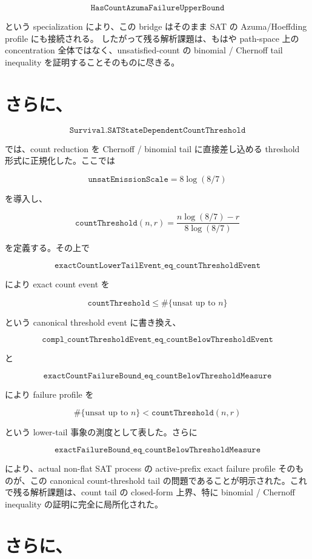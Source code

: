 \documentclass[12pt,a4paper]{article}
\begin{document}
\[
\texttt{HasCountAzumaFailureUpperBound}
\]

という specialization により、この bridge はそのまま SAT の Azuma/Hoeffding profile にも接続される。 したがって残る解析課題は、もはや path-space 上の concentration 全体ではなく、unsatisfied-count の binomial / Chernoff tail inequality を証明することそのものに尽きる。

\section{さらに、}\label{ux3055ux3089ux306b-23}

\[
\texttt{Survival.SATStateDependentCountThreshold}
\]

では、count reduction を Chernoff / binomial tail に直接差し込める threshold 形式に正規化した。ここでは

\[
\texttt{unsatEmissionScale}=8\log(8/7)
\]

を導入し、

\[
\texttt{countThreshold}(n,r)=\frac{n\log(8/7)-r}{8\log(8/7)}
\]

を定義する。その上で

\[
\texttt{exactCountLowerTailEvent\_eq\_countThresholdEvent}
\]

により exact count event を

\[
\texttt{countThreshold} \le \#\{\text{unsat up to }n\}
\]

という canonical threshold event に書き換え、

\[
\texttt{compl\_countThresholdEvent\_eq\_countBelowThresholdEvent}
\]

と

\[
\texttt{exactCountFailureBound\_eq\_countBelowThresholdMeasure}
\]

により failure profile を

\[
\#\{\text{unsat up to }n\} < \texttt{countThreshold}(n,r)
\]

という lower-tail 事象の測度として表した。さらに

\[
\texttt{exactFailureBound\_eq\_countBelowThresholdMeasure}
\]

により、actual non-flat SAT process の active-prefix exact failure profile そのものが、この canonical count-threshold tail の問題であることが明示された。これで残る解析課題は、count tail の closed-form 上界、特に binomial / Chernoff inequality の証明に完全に局所化された。

\section{さらに、}\label{ux3055ux3089ux306b-24}
\end{document}
